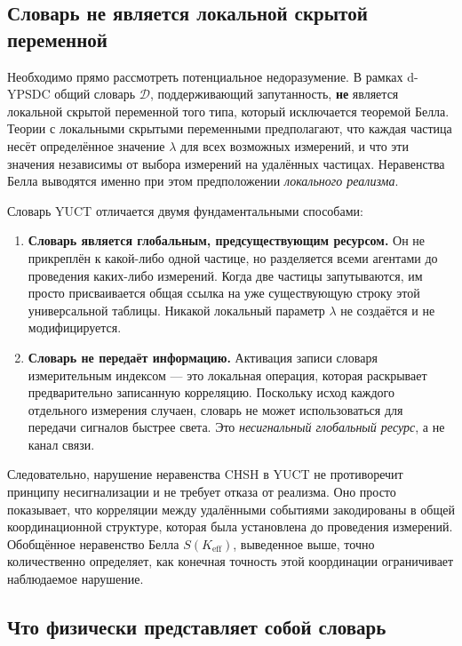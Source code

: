 \documentclass[12pt,a4paper]{article}
\theoremstyle{remark}
\begin{document}
	\subsection*{Словарь не является локальной скрытой переменной}
	
	Необходимо прямо рассмотреть потенциальное недоразумение. В рамках d-YPSDC общий словарь $\mathcal{D}$, поддерживающий запутанность, \textbf{не} является локальной скрытой переменной того типа, который исключается теоремой Белла. Теории с локальными скрытыми переменными предполагают, что каждая частица несёт определённое значение $\lambda$ для всех возможных измерений, и что эти значения независимы от выбора измерений на удалённых частицах. Неравенства Белла выводятся именно при этом предположении \emph{локального реализма}.
	
	Словарь YUCT отличается двумя фундаментальными способами:
	
	\begin{enumerate}[leftmargin=*]
		\item \textbf{Словарь является глобальным, предсуществующим ресурсом.}
		Он не прикреплён к какой-либо одной частице, но разделяется всеми агентами до проведения каких-либо измерений. Когда две частицы запутываются, им просто присваивается общая ссылка на уже существующую строку этой универсальной таблицы. Никакой локальный параметр $\lambda$ не создаётся и не модифицируется.
		
		\item \textbf{Словарь не передаёт информацию.}
		Активация записи словаря измерительным индексом — это локальная операция, которая раскрывает предварительно записанную корреляцию. Поскольку исход каждого отдельного измерения случаен, словарь не может использоваться для передачи сигналов быстрее света. Это \emph{несигнальный глобальный ресурс}, а не канал связи.
	\end{enumerate}
	
	Следовательно, нарушение неравенства CHSH в YUCT не противоречит принципу несигнализации и не требует отказа от реализма. Оно просто показывает, что корреляции между удалёнными событиями закодированы в общей координационной структуре, которая была установлена до проведения измерений. Обобщённое неравенство Белла $S(K_{\mathrm{eff}})$, выведенное выше, точно количественно определяет, как конечная точность этой координации ограничивает наблюдаемое нарушение.
	
\subsection*{Что физически представляет собой словарь}
\end{document}
